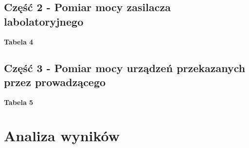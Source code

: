 \documentclass[11pt]{article}
\begin{document}
    \subsection*{Część 2 - Pomiar mocy zasilacza labolatoryjnego}
    \begin{center}
        \textbf{\small Tabela 4}
    \end{center}
    \begin{center}
    \end{center}

    \subsection*{Część 3 - Pomiar mocy urządzeń przekazanych przez prowadzącego}
    \begin{center}
        \textbf{\small Tabela 5}
    \end{center}
    \begin{center}
    \end{center}

    \section{Analiza wyników}
\end{document}

